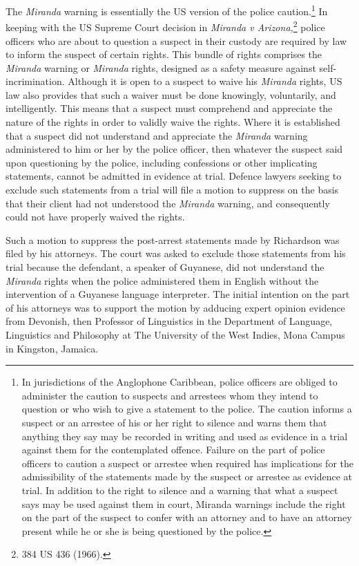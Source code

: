 \documentclass[output=paper,colorlinks,citecolor=brown]{langscibook}
\begin{document}
The \emph{Miranda} warning is essentially the US version of the police caution.\footnote{In jurisdictions of the Anglophone Caribbean, police officers are obliged to administer the caution to suspects and arrestees whom they intend to question or who wish to give a statement to the police. The caution informs a suspect or an arrestee of his or her right to silence and warns them that anything they say may be recorded in writing and used as evidence in a trial against them for the contemplated offence. Failure on the part of police officers to caution a suspect or arrestee when required has implications for the admissibility of the statements made by the suspect or arrestee as evidence at trial.  In addition to the right to silence and a warning that what a suspect says may be used against them in court, Miranda warnings include the right on the part of the suspect to confer with an attorney and to have an attorney present while he or she is being questioned by the police.} In keeping with the US Supreme Court decision in \emph{Miranda v Arizona,}\footnote{384 US 436 (1966).} police officers who are about to question a suspect in their custody are required by law to inform the suspect of certain rights. This bundle of rights comprises the \emph{Miranda} warning or \emph{Miranda} rights, designed as a safety measure against self-in\-crim\-i\-na\-tion. Although it is open to a suspect to waive his \textit{Miranda} rights, US law also provides that such a waiver must be done knowingly, voluntarily, and intelligently. This means that a suspect must comprehend and appreciate the nature of the rights in order to validly waive the rights.  Where it is established that a suspect did not understand and appreciate the \emph{Miranda} warning administered to him or her by the police officer, then whatever the suspect said upon questioning by the police, including confessions or other implicating statements, cannot be admitted in evidence at trial. Defence lawyers seeking to exclude such statements from a trial will file a motion to suppress on the basis that their client had not understood the \emph{Miranda} warning, and consequently could not have properly waived the rights.

Such a motion to suppress the post-arrest statements made by Richardson was filed by his attorneys. The court was asked to exclude those statements from his trial because the defendant, a speaker of Guyanese, did not understand the \emph{Miranda} rights when the police administered them in English without the intervention of a Guyanese language interpreter. The initial intention on the part of his attorneys was to support the motion by adducing expert opinion evidence from Devonish, then Professor of Linguistics in the Department of Language, Linguistics and Philosophy at The University of the West Indies, Mona Campus in Kingston, Jamaica. 
\end{document}
